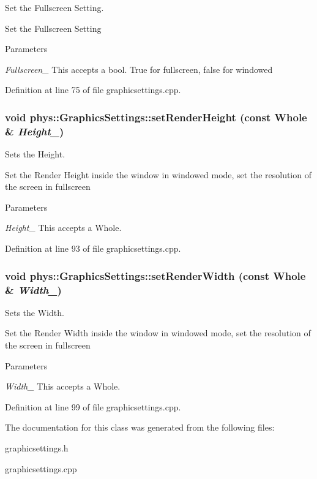 Set the Fullscreen Setting. 

Set the Fullscreen Setting 
\begin{DoxyParams}{Parameters}
\item[{\em Fullscreen\_\-}]This accepts a bool. True for fullscreen, false for windowed \end{DoxyParams}


Definition at line 75 of file graphicsettings.cpp.

\hypertarget{classphys_1_1GraphicsSettings_a1e6b11740f681beb4d64553656a760f1}{
\subsubsection[{setRenderHeight}]{\setlength{\rightskip}{0pt plus 5cm}void phys::GraphicsSettings::setRenderHeight (const Whole \& {\em Height\_\-})}}
\label{dc/df1/classphys_1_1GraphicsSettings_a1e6b11740f681beb4d64553656a760f1}


Sets the Height. 

Set the Render Height inside the window in windowed mode, set the resolution of the screen in fullscreen 
\begin{DoxyParams}{Parameters}
\item[{\em Height\_\-}]This accepts a Whole. \end{DoxyParams}


Definition at line 93 of file graphicsettings.cpp.

\hypertarget{classphys_1_1GraphicsSettings_a7cebb39f829f5e600231b4efc22b9ec3}{
\subsubsection[{setRenderWidth}]{\setlength{\rightskip}{0pt plus 5cm}void phys::GraphicsSettings::setRenderWidth (const Whole \& {\em Width\_\-})}}
\label{dc/df1/classphys_1_1GraphicsSettings_a7cebb39f829f5e600231b4efc22b9ec3}


Sets the Width. 

Set the Render Width inside the window in windowed mode, set the resolution of the screen in fullscreen 
\begin{DoxyParams}{Parameters}
\item[{\em Width\_\-}]This accepts a Whole. \end{DoxyParams}


Definition at line 99 of file graphicsettings.cpp.



The documentation for this class was generated from the following files:\begin{DoxyCompactItemize}
\item 
graphicsettings.h\item 
graphicsettings.cpp\end{DoxyCompactItemize}
